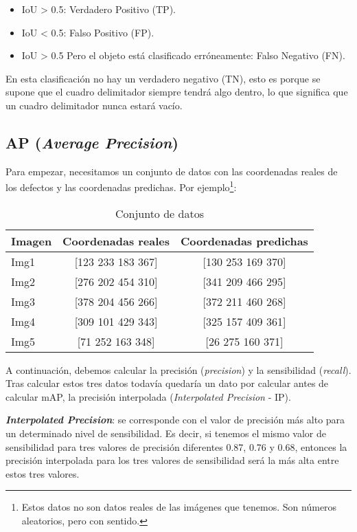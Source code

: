 \begin{itemize}
    \item IoU > 0.5: Verdadero Positivo (TP).
    \item IoU < 0.5: Falso Positivo (FP).
    \item IoU > 0.5 Pero el objeto está clasificado erróneamente: Falso Negativo (FN).
\end{itemize}

En esta clasificación no hay un verdadero negativo (TN), esto es porque se supone que el cuadro delimitador siempre tendrá algo dentro, lo que significa que un cuadro delimitador nunca estará vacío.

\subsection{AP (\textit{Average Precision})}

Para empezar, necesitamos un conjunto de datos con las coordenadas reales de los defectos y las coordenadas predichas. Por ejemplo\footnote{Estos datos no son datos reales de las imágenes que tenemos. Son números aleatorios, pero con sentido.}:

\begin{table}[h]
	\begin{center}
		\begin{tabular}{l | c c}
			Imagen & Coordenadas reales & Coordenadas predichas\\ \hline
			Img1 & [123 233 183 367] & [130 253 169 370]\\
			Img2 & [276 202 454 310] & [341 209 466 295]\\
			Img3 & [378 204 456 266] & [372 211 460 268]\\
			Img4 & [309 101 429 343] & [325 157 409 361]\\
			Img5 & [71 252 163 348] & [26 275 160 371]\\
		\end{tabular}
		\caption{Conjunto de datos}
		\label{conjuntodedatos}
	\end{center}
\end{table}

A continuación, debemos calcular la precisión (\textit{precision}) y la sensibilidad (\textit{recall}). Tras calcular estos tres datos todavía quedaría un dato por calcular antes de calcular mAP, la precisión interpolada (\textit{Interpolated Precision} - IP).

\textbf{\textit{Interpolated Precision}}: se corresponde con el valor de precisión más alto para un determinado nivel de sensibilidad. Es decir, si tenemos el mismo valor de sensibilidad para tres valores de precisión diferentes 0.87, 0.76 y 0.68, entonces la precisión interpolada para los tres valores de sensibilidad será la más alta entre estos tres valores.

